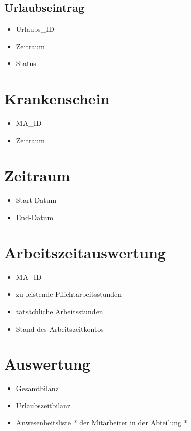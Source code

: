 \subsection{Urlaubseintrag}
\begin{itemize}[label=+]
\item[] Urlaubs\_ID
\item Zeitraum
\item Status
\end{itemize}
\section{Krankenschein}
\begin{itemize}[label=+]
\item[] MA\_ID
\item Zeitraum
\end{itemize}
\section{Zeitraum}
\begin{itemize}[label=+]
\item[] Start-Datum
\item End-Datum
\end{itemize}

\section{Arbeitszeitauswertung}
\begin{itemize}[label=+]
\item[] MA\_ID
\item zu leistende Pflichtarbeitsstunden
\item tatsächliche Arbeitsstunden
\item Stand des Arbeitszeitkontos
\end{itemize}

\section{Auswertung}
\begin{itemize}[label=+]
\item[] Gesamtbilanz
\item Urlaubszeitbilanz
\item Anwesenheitsliste * der Mitarbeiter in der Abteilung *
\end{itemize}

